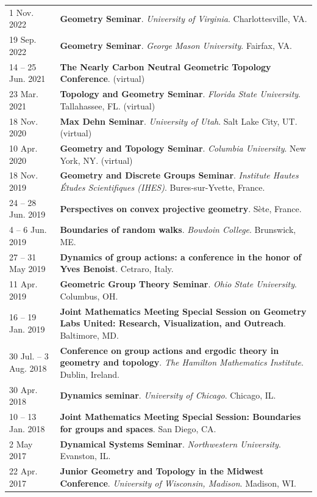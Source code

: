 \begin{center}
{\begin{longtable}{p{}  p{}}
1 Nov.  2022 & \textbf{Geometry Seminar}. \textit{University of Virginia}.  Charlottesville, VA.  \\ 
19 Sep.  2022 & \textbf{Geometry Seminar}. \textit{George Mason University}.  Fairfax, VA.  \\ 
14  -- 25 Jun.  2021 & \textbf{The Nearly Carbon Neutral Geometric Topology Conference}. (virtual) \\ 
23 Mar.  2021 & \textbf{Topology and Geometry Seminar}. \textit{Florida State University}.  Tallahassee, FL. (virtual) \\ 
18 Nov.  2020 & \textbf{Max Dehn Seminar}. \textit{University of Utah}.  Salt Lake City, UT. (virtual) \\ 
10 Apr.  2020 & \textbf{Geometry and Topology Seminar}. \textit{Columbia University}.  New York, NY. (virtual) \\ 
18 Nov.  2019 & \textbf{Geometry and Discrete Groups Seminar}. \textit{Institute Hautes \'Etudes Scientifiques (IHES)}.  Bures-sur-Yvette, France.  \\ 
24  -- 28 Jun.  2019 & \textbf{Perspectives on convex projective geometry}.  S\`ete, France.  \\ 
4  -- 6 Jun.  2019 & \textbf{Boundaries of random walks}. \textit{Bowdoin College}.  Brunswick, ME.  \\ 
27  -- 31 May  2019 & \textbf{Dynamics of group actions: a conference in the honor of Yves Benoist}.  Cetraro, Italy.  \\ 
11 Apr.  2019 & \textbf{Geometric Group Theory Seminar}. \textit{Ohio State University}.  Columbus, OH.  \\ 
16  -- 19 Jan.  2019 & \textbf{Joint Mathematics Meeting Special Session on Geometry Labs United: Research, Visualization, and Outreach}.  Baltimore, MD.  \\ 
30 Jul.  -- 3 Aug.  2018 & \textbf{Conference on group actions and ergodic theory in geometry and topology}. \textit{The Hamilton Mathematics Institute}.  Dublin, Ireland.  \\ 
30 Apr.  2018 & \textbf{Dynamics seminar}. \textit{University of Chicago}.  Chicago, IL.  \\ 
10  -- 13 Jan.  2018 & \textbf{Joint Mathematics Meeting Special Session: Boundaries for groups and spaces}.  San Diego, CA.  \\ 
2 May  2017 & \textbf{Dynamical Systems Seminar}. \textit{Northwestern University}.  Evanston, IL.  \\ 
22 Apr.  2017 & \textbf{Junior Geometry and Topology in the Midwest Conference}. \textit{University of Wisconsin, Madison}.  Madison, WI.  \\ 

\end{longtable}}
\end{center}
